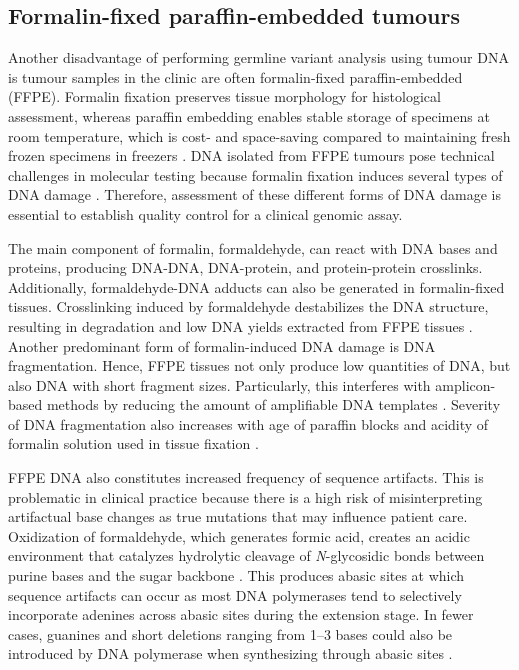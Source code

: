 \subsection{Formalin-fixed paraffin-embedded tumours}

Another disadvantage of performing germline variant analysis using tumour DNA is tumour samples in the clinic are often formalin-fixed paraffin-embedded (\acs{FFPE}). Formalin fixation preserves tissue morphology for histological assessment, whereas paraffin embedding enables stable storage of specimens at room temperature, which is cost- and space-saving compared to maintaining fresh frozen specimens in freezers \cite{Dong2015, Do2015a}. DNA isolated from FFPE tumours pose technical challenges in molecular testing because formalin fixation induces several types of DNA damage \cite{Do2015a}. Therefore, assessment of these different forms of DNA damage is essential to establish quality control for a clinical genomic assay.

The main component of formalin, formaldehyde, can react with DNA bases and proteins, producing DNA-DNA, DNA-protein, and protein-protein crosslinks. Additionally, formaldehyde-DNA adducts can also be generated in formalin-fixed tissues. Crosslinking induced by formaldehyde destabilizes the DNA structure, resulting in degradation and low DNA yields extracted from FFPE tissues \cite{Do2015a}. Another predominant form of formalin-induced DNA damage is DNA fragmentation. Hence, FFPE tissues not only produce low quantities of DNA, but also DNA with short fragment sizes. Particularly, this interferes with amplicon-based methods by reducing the amount of amplifiable DNA templates \cite{Shi2002, Didelot2013, Wong2013}. Severity of DNA fragmentation also increases with age of paraffin blocks and acidity of formalin solution used in tissue fixation \cite{Ludyga2012, Carrick2015}.

FFPE DNA also constitutes increased frequency of sequence artifacts. This is problematic in clinical practice because there is a high risk of misinterpreting artifactual base changes as true mutations that may influence patient care. Oxidization of formaldehyde, which generates formic acid, creates an acidic environment that catalyzes hydrolytic cleavage of \textit{N}-glycosidic bonds between purine bases and the sugar backbone \cite{Do2015a}. This produces abasic sites at which sequence artifacts can occur as most DNA polymerases tend to selectively incorporate adenines across abasic sites during the extension stage. In fewer cases, guanines and short deletions ranging from 1--3 bases could also be introduced by DNA polymerase when synthesizing through abasic sites \cite{Heyn2010}.

